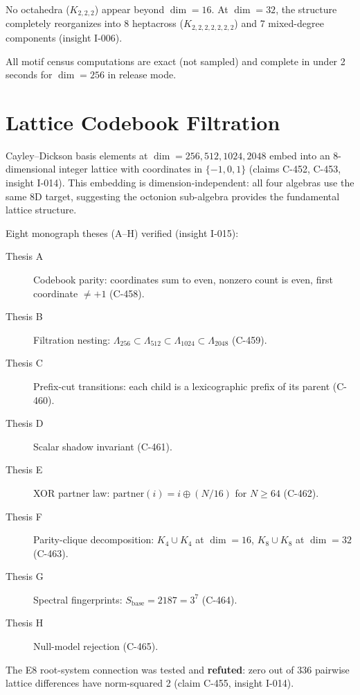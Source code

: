 \documentclass{article}
\theoremstyle{definition}
\theoremstyle{plain}
\theoremstyle{remark}
\begin{document}
No octahedra ($K_{2,2,2}$) appear beyond $\dim = 16$.  At $\dim = 32$, the
structure completely reorganizes into 8 heptacross ($K_{2,2,2,2,2,2,2}$) and
7 mixed-degree components (insight I-006).

All motif census computations are exact (not sampled) and complete in under
2 seconds for $\dim = 256$ in release mode.

\section{Lattice Codebook Filtration}
\label{sec:lattice}

Cayley--Dickson basis elements at $\dim = 256, 512, 1024, 2048$ embed into an
8-dimensional integer lattice with coordinates in $\{-1, 0, 1\}$
(claims C-452, C-453, insight I-014).  This embedding is dimension-independent:
all four algebras use the same 8D target, suggesting the octonion sub-algebra
provides the fundamental lattice structure.

Eight monograph theses (A--H) verified \cite{reggiani2024} (insight I-015):

\begin{description}
  \item[Thesis A] Codebook parity: coordinates sum to even, nonzero count is even,
    first coordinate $\neq +1$ (C-458).
  \item[Thesis B] Filtration nesting: $\Lambda_{256} \subset \Lambda_{512}
    \subset \Lambda_{1024} \subset \Lambda_{2048}$ (C-459).
  \item[Thesis C] Prefix-cut transitions: each child is a lexicographic prefix
    of its parent (C-460).
  \item[Thesis D] Scalar shadow invariant (C-461).
  \item[Thesis E] XOR partner law: $\text{partner}(i) = i \oplus (N/16)$ for
    $N \geq 64$ (C-462).
  \item[Thesis F] Parity-clique decomposition: $K_4 \cup K_4$ at $\dim = 16$,
    $K_8 \cup K_8$ at $\dim = 32$ (C-463).
  \item[Thesis G] Spectral fingerprints: $S_{\text{base}} = 2187 = 3^7$ (C-464).
  \item[Thesis H] Null-model rejection (C-465).
\end{description}

The E8 root-system connection was tested and \textbf{refuted}: zero out of 336
pairwise lattice differences have norm-squared 2 (claim C-455, insight I-014).
\end{document}
